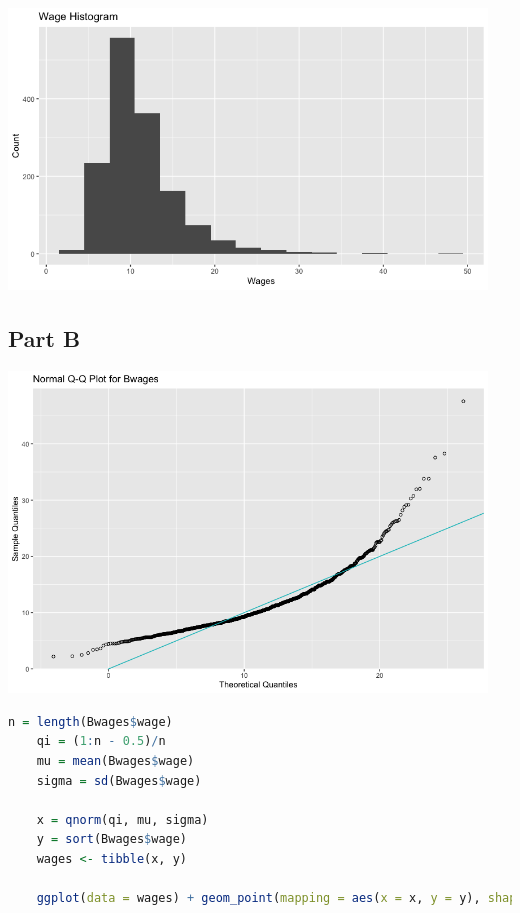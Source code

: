 \documentclass[letterpaper]{article}
\begin{document}
\begin{center}
    \includegraphics[width=5in]{wageHistogram.png}
\end{center}

\subsection*{Part B}

\begin{center}
    \includegraphics[width=5in]{QQPlot.png}
\end{center}

\begin{lstlisting}[language=R]
    n = length(Bwages$wage)
    qi = (1:n - 0.5)/n
    mu = mean(Bwages$wage)
    sigma = sd(Bwages$wage)

    x = qnorm(qi, mu, sigma)
    y = sort(Bwages$wage)
    wages <- tibble(x, y)

    ggplot(data = wages) + geom_point(mapping = aes(x = x, y = y), shape = 1) + geom_abline(intercept = 0, slope = 1) + xlab("Theoretical Quantiles") + ylab("Sample Quantiles") + ggtitle("Normal Q-Q Plot for Bwages")
\end{lstlisting}
\end{document}
